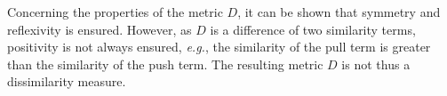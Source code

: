Concerning the properties of the metric $D$, it can be shown that symmetry and reflexivity is ensured. However, as $D$ is a difference of two similarity terms, positivity is not always ensured, \textit{e.g.}, the similarity of the pull term is greater than the similarity of the push term. The resulting metric $D$ is not thus a dissimilarity measure.



%


